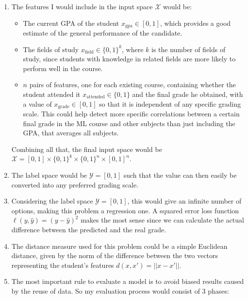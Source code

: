 \documentclass[a4paper,12pt]{article}
\begin{document}
\begin{enumerate}
    \item The features I would include in the input space $\mathcal{X}$ would be:
        \begin{itemize}
            \item The current GPA of the student $x_\text{gpa} \in [0, 1]$, which provides a good estimate
            of the general performance of the candidate.
            \item The fields of study $x_\text{field} \in \{0, 1\}^k$, where $k$ is
            the number of fields of study, since students with knowledge in related
            fields are more likely to perform well in the course.
            \item $n$ pairs of features, one for each existing course, containing
            whether the student attended it $x_\text{attended} \in \{0, 1\}$ and the final grade he obtained,
            with a value of $x_\text{grade} \in [0, 1]$ so that it is independent of any specific grading scale.
            This could help detect more specific correlations between a certain final
            grade in the ML course and other subjects than just including the GPA,
            that averages all subjects.
        \end{itemize}
        Combining all that, the final input space would be
        $\mathcal{X} = [0, 1] \times \{0, 1\}^k \times \{0, 1\}^n \times [0, 1]^n$.
    \item The label space would be $\mathcal{Y} = [0, 1]$ such that
        the value can then easily be converted into any preferred grading scale.
    \item Considering the label space $\mathcal{Y} = [0, 1]$, this
        would give an infinite number of options, making this problem a regression one.
        A squared error loss function $\ell(y, \hat{y}) = (y - \hat{y})^2$
        makes the most sense since we can calculate the actual difference between
        the predicted and the real grade.
    \item The distance measure used for this problem could be a simple Euclidean
        distance, given by the norm of the difference between the two vectors
        representing the student's features $d(x, x') = \left|\left|x - x'\right|\right|$.
    \item The most important rule to evaluate a model is to avoid biased results
        caused by the reuse of data. So my evaluation process would consist of 3 phases:
        \begin{enumerate}

\end{enumerate}
\end{enumerate}
\end{document}
